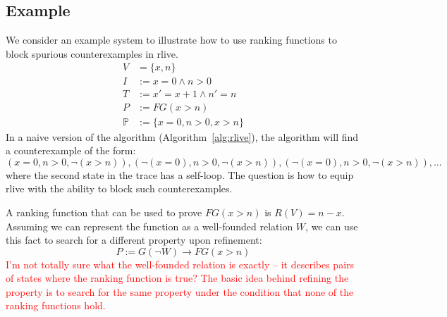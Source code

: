 \documentclass[runningheads]{llncs}
\newcommand{\red}[1]{\textcolor{red}{#1}}
\newcommand{\rlive}{\textsf{rlive}\xspace}
\newcommand{\preds}{\ensuremath{\mathbb{P}}}
\begin{document}
\subsection{Example}


We consider an example system to illustrate how to use ranking functions to block spurious counterexamples in \rlive.
\begin{align*}
    V & = \{x,n\} \\
    I & := x = 0 \land n > 0 \\
    T & := x' = x + 1 \land n' = n \\
    P & := FG(x>n) \\
    \preds & := \{ x=0, n>0, x>n \}
\end{align*}
In a naive version of the algorithm (Algorithm~\ref{alg:rlive}), the algorithm will find a counterexample of the form:
\[
    (x=0,n>0,\neg(x>n)), (\neg(x=0),n>0,\neg(x>n)), (\neg(x=0),n>0,\neg(x>n)), \dots
\]
where the second state in the trace has a self-loop. The question is how to equip \rlive with the
ability to block such counterexamples.

A ranking function that can be used to prove $FG(x>n)$ is $R(V) = n-x$. Assuming we can represent the function as a well-founded relation $W$, we can use this fact to search for a different property upon refinement: 
\[
    P := G(\neg W) \rightarrow FG(x>n)
\]
\red{I'm not totally sure what the well-founded relation is exactly -- it describes pairs of states where the ranking function is true? The basic idea behind refining the property is to search for the same property under the condition that none of the ranking functions hold.}




\end{document}
